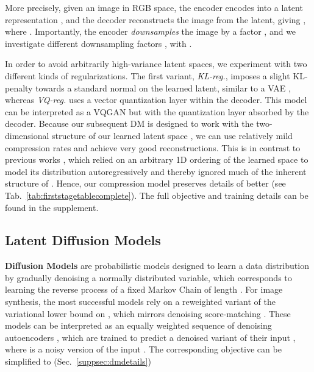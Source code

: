 \documentclass[10pt,twocolumn,letterpaper]{article}
\begin{document}
More precisely, given an image  in RGB space, 
the encoder  encodes  into a latent representation , and the decoder 
reconstructs the image from the latent, giving , where .
Importantly, the encoder \emph{downsamples} the image by a factor , and we investigate different downsampling 
factors , with . 


In order to avoid arbitrarily 
high-variance
latent spaces, we experiment with two different kinds of regularizations. The 
first variant, \emph{KL-reg.}, imposes a slight KL-penalty towards a standard
normal on the learned latent, similar to 
a VAE \cite{VAE,VAE2}, whereas \emph{VQ-reg.}
uses a vector quantization layer \cite{DBLP:conf/nips/OordVK17} within 
the decoder. This model can be interpreted as a VQGAN \cite{DBLP:journals/corr/abs-2012-09841} but with the quantization layer
absorbed by the decoder. Because our subsequent DM
is designed to work with the two-dimensional structure of
our learned latent space , we can use relatively mild
compression rates and achieve very good reconstructions. This is in contrast to
previous works \cite{DBLP:journals/corr/abs-2012-09841,
DBLP:journals/corr/abs-2102-12092},
which relied on an arbitrary 1D ordering of the learned space  to model its
distribution autoregressively and thereby ignored much of the
inherent structure of .
Hence, our compression model preserves details of  better (see Tab.~\ref{tab:firststagetablecomplete}).
The full objective and training details can be found in the supplement.












\subsection{Latent Diffusion Models}
\label{subsec:stagetwo}
\noindent \textbf{Diffusion Models} \cite{DBLP:journals/corr/Sohl-DicksteinW15} are probabilistic models designed to learn a data distribution  by 
gradually denoising a normally distributed variable, which corresponds to learning
the reverse process of a fixed Markov Chain of length . 
For image synthesis, the most successful models \cite{DBLP:conf/nips/HoJA20, DBLP:journals/corr/abs-2105-05233, DBLP:journals/corr/abs-2104-07636}
rely on a reweighted variant of the variational lower bound on , which mirrors denoising score-matching \cite{DBLP:journals/corr/abs-2011-13456}.
These models can be interpreted as an equally weighted sequence of denoising autoencoders , 
which are trained to predict a denoised variant of their input , where  is a noisy version of the input .
The corresponding objective can be simplified to (Sec.~\ref{suppsec:dmdetails})
\end{document}
